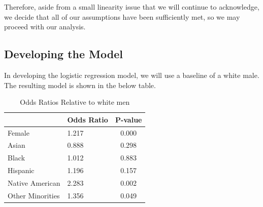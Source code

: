 \documentclass[]{article}
\begin{document}
Therefore, aside from a small linearity issue that we will continue to
acknowledge, we decide that all of our assumptions have been
sufficiently met, so we may proceed with our analysis.

\subsection{Developing the Model}\label{developing-the-model}

In developing the logistic regression model, we will use a baseline of a
white male. The resulting model is shown in the below table.

\begin{table}[H]

\caption{\label{tab:odds_ratios}Odds Ratios Relative to white men}
\centering
\fontsize{12}{14}\selectfont
\begin{tabular}[t]{l|l|c}
\hline
  & Odds Ratio & P-value\\
\hline
Female & 1.217 & 0.000\\
\hline
Asian & 0.888 & 0.298\\
\hline
Black & 1.012 & 0.883\\
\hline
Hispanic & 1.196 & 0.157\\
\hline
Native American & 2.283 & 0.002\\
\hline
Other Minorities & 1.356 & 0.049\\
\hline
\end{tabular}
\end{table}
\end{document}
